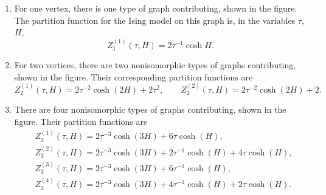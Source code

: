 \documentclass[pdftex]{sigma}
\numberwithin{equation}{section}
\begin{document}
\begin{enumerate}\setlength{\leftskip}{0.35cm}\itemsep=0pt
 \item[$V=1$.] For one vertex, there is one type of graph contributing, shown in the figure. The partition function for the Ising model on this graph is, in the variables $\tau$, $H$,
 \begin{equation*}
 Z_1^{(1)}(\tau,H) = 2\tau^{-1}\cosh H.
 \end{equation*}
 \item[$V=2$.] For two vertices, there are two nonisomorphic types of graphs contributing, shown in the figure. Their corresponding partition functions are
 \begin{equation*}
 Z_2^{(1)}(\tau,H) = 2\tau^{-2} \cosh(2H) + 2\tau^2, \qquad Z_2^{(2)}(\tau,H) = 2\tau^{-2}\cosh(2H) + 2.
 \end{equation*}
 \item[$V=3$.] There are four nonisomorphic types of graphs contributing, shown in the figure. Their partition functions are
 \begin{align*}
 &Z_3^{(1)}(\tau,H)= 2\tau^{-3}\cosh(3H)+6\tau\cosh(H),\nonumber\\
 &Z_3^{(2)}(\tau,H)= 2\tau^{-3}\cosh(3H) + 2\tau^{-1}\cosh(H) + 4\tau \cosh(H),\\
 &Z_3^{(3)}(\tau,H)= 2\tau^{-3}\cosh(3H)+6\tau^{-1}\cosh(H), \nonumber\\
 &Z_3^{(4)}(\tau,H)= 2\tau^{-3}\cosh(3H) + 4\tau^{-1}\cosh(H) + 2\tau \cosh(H).\nonumber
 \end{align*}
\end{enumerate}
\end{document}
